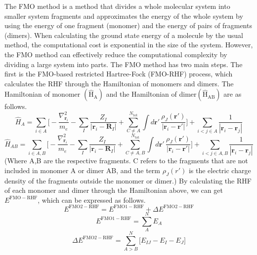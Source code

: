 \documentclass[pdflatex,sn-mathphys-num]{sn-jnl}%
\theoremstyle{thmstyleone}%
\theoremstyle{thmstyletwo}%
\theoremstyle{thmstylethree}%
\begin{document}
The FMO method is a method that divides a whole molecular system into smaller system fragments and approximates the energy of the whole system by using the energy of one fragment (monomer) and the energy of pairs of fragments (dimers). When calculating the ground state energy of a molecule by the usual method, the computational cost is exponential in the size of the system. However, the FMO method can effectively reduce the computational complexity by dividing a large system into parts. 
The FMO method has two main steps. The first is the FMO-based restricted Hartree-Fock (FMO-RHF) process, which calculates the RHF through the Hamiltonian of monomers and dimers. The Hamiltonian of monomer \(\mathrm{(\hat{H}_{A})}\) and the Hamiltonian of dimer\(\mathrm{(\hat{H}_{AB})}\) are as follows.
\begin{equation}
\hat{H}_A = 
\sum_{i \in A} \Bigg[
    -\frac{\nabla_{\mathbf{r}_i}^2}{m_e}
    - \sum_I \frac{Z_I}{|\mathbf{r}_i - \mathbf{R}_I|}
    + \sum_{C \neq A}^{N_{\mathrm{tot}}} 
      \int d\mathbf{r}' \, \frac{\rho_J(\mathbf{r}')}{|\mathbf{r}_i - \mathbf{r}'|}
\Bigg]
+ \sum_{i<j \in A} \frac{1}{|\mathbf{r}_i - \mathbf{r}_j|}\label{eq5}
\end{equation}
\begin{equation}
\hat{H}_{AB} = 
\sum_{i \in A,B} \Bigg[
    -\frac{\nabla_{\mathbf{r}_i}^2}{m_e}
    - \sum_I \frac{Z_I}{|\mathbf{r}_i - \mathbf{R}_I|}
    + \sum_{C \neq A,B}^{N_{\mathrm{tot}}} 
      \int d\mathbf{r}' \, \frac{\rho_J(\mathbf{r}')}{|\mathbf{r}_i - \mathbf{r}'|}
\Bigg] + \sum_{i<j \in A,B} \frac{1}{|\mathbf{r}_i - \mathbf{r}_j|}
\end{equation}
(Where A,B are the respective fragments. C refers to the fragments that are not included in monomer A or dimer AB, and the term \(\rho_J(r')\) is the electric charge density of the fragments outside the monomer or dimer.) By calculating the RHF of each monomer and dimer through the Hamiltonian above, we can get \({E^\mathrm{FMO-RHF}}\), which can be expressed as follows.
\begin{equation}
E^{\mathrm{FMO2\!-\!RHF}} = E^{\mathrm{FMO1\!-\!RHF}} + \Delta E^{\mathrm{FMO2\!-\!RHF}}
\end{equation}
\begin{equation}
E^{\mathrm{FMO1\!-\!RHF}} = \sum_{A}^{N} E_A
\end{equation}
\begin{equation}
\Delta E^{\mathrm{FMO2\!-\!RHF}} = \sum_{A > B}^{N} \Big[ E_{IJ} - E_I - E_J \Big]
\end{equation}
\end{document}
